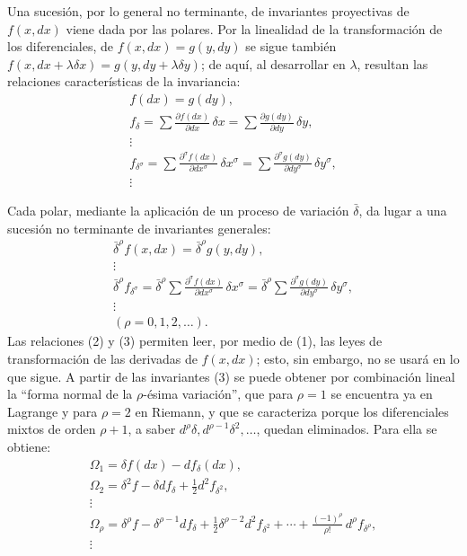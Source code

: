 \documentclass[11pt]{article}
\newcommand{\bdelta}{\bar{\delta}}
\begin{document}
Una sucesión, por lo general no terminante, de invariantes proyectivas de
\(f(x,dx)\) viene dada por las polares. Por la linealidad de la transformación
de los diferenciales, de \(f(x,dx)=g(y,dy)\) se sigue también
\(f(x,dx+\lambda\delta x)=g(y,dy+\lambda\delta y)\); de aquí, al desarrollar
en \(\lambda\), resultan las relaciones características de la invariancia:
\begin{equation}
\begin{gathered}
f(dx)=g(dy),\\
f_\delta=\sum\frac{\partial f(dx)}{\partial dx}\,\delta x
       =\sum\frac{\partial g(dy)}{\partial dy}\,\delta y,\\
\vdots\\
f_{\delta^\sigma}=
\sum\frac{\partial^\sigma f(dx)}{\partial dx^\sigma}\,\delta x^\sigma
=
\sum\frac{\partial^\sigma g(dy)}{\partial dy^\sigma}\,\delta y^\sigma,\\
\vdots
\end{gathered}
\tag{2}
\end{equation}

Cada polar, mediante la aplicación de un proceso de variación \(\bdelta\), da
lugar a una sucesión no terminante de invariantes generales:
\begin{equation}
\begin{gathered}
\bdelta^\rho f(x,dx)=\bdelta^\rho g(y,dy),\\
\vdots\\
\bdelta^\rho f_{\delta^\sigma}
=\bdelta^\rho\sum\frac{\partial^\sigma f(dx)}{\partial dx^\sigma}\,
\delta x^\sigma
=\bdelta^\rho\sum\frac{\partial^\sigma g(dy)}{\partial dy^\sigma}\,
\delta y^\sigma,\\
\vdots\\[0.2em]
(\rho=0,1,2,\ldots).
\end{gathered}
\tag{3}
\end{equation}
Las relaciones (2) y (3) permiten leer, por medio de (1), las leyes de
transformación de las derivadas de \(f(x,dx)\); esto, sin embargo, no se usará
en lo que sigue. A partir de las invariantes (3) se puede obtener por
combinación lineal la ``forma normal de la \(\rho\)-ésima variación'', que para
\(\rho=1\) se encuentra ya en Lagrange y para \(\rho=2\) en Riemann, y que se
caracteriza porque los diferenciales mixtos de orden \(\rho+1\), a saber
\(d^\rho\delta,d^{\rho-1}\delta^2,\ldots\), quedan eliminados. Para ella se
obtiene:
\begin{equation}
\begin{gathered}
\Omega_1=\delta f(dx)-d f_\delta(dx),\\
\Omega_2=\delta^2 f-\delta d f_\delta+\frac12 d^2 f_{\delta^2},\\
\vdots\\
\Omega_\rho=\delta^\rho f-\delta^{\rho-1}d f_\delta
+\frac12\delta^{\rho-2}d^2 f_{\delta^2}
+\cdots+\frac{(-1)^\rho}{\rho!}\,d^\rho f_{\delta^\rho},\\
\vdots
\end{gathered}
\tag{4}
\end{equation}
\end{document}
